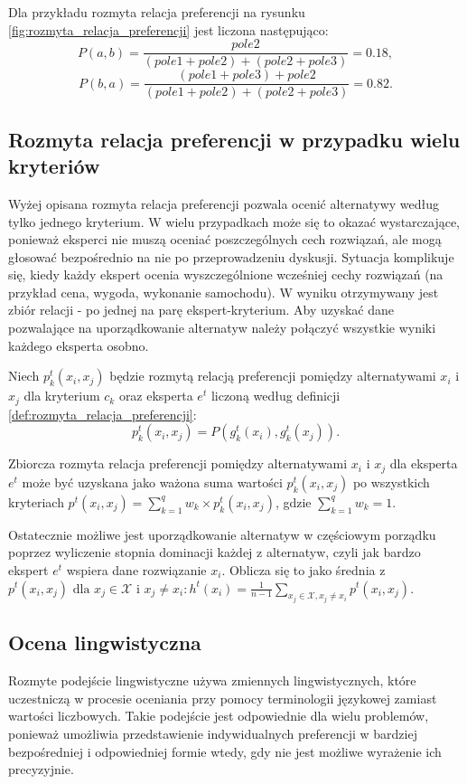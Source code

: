 Dla przykładu rozmyta relacja preferencji na rysunku
\ref{fig:rozmyta_relacja_preferencji} jest liczona następująco:
$$P(a,b) = \frac{pole2}{(pole1 + pole2) + (pole2 + pole3)} = 0.18,$$
$$P(b,a) = \frac{(pole1 + pole3) + pole2}{(pole1 + pole2) + (pole2 + pole3)} =
0.82.$$

\subsection{Rozmyta relacja preferencji w przypadku wielu kryteriów}
Wyżej opisana rozmyta relacja preferencji pozwala ocenić alternatywy według
tylko jednego kryterium. W wielu przypadkach może się to okazać wystarczające,
ponieważ eksperci nie muszą oceniać poszczególnych cech rozwiązań, ale mogą
głosować bezpośrednio na nie po przeprowadzeniu dyskusji. Sytuacja komplikuje
się, kiedy każdy ekspert ocenia wyszczególnione wcześniej cechy rozwiązań (na
przykład cena, wygoda, wykonanie samochodu). W wyniku otrzymywany jest zbiór
relacji - po jednej na parę ekspert-kryterium. Aby uzyskać dane pozwalające na
uporządkowanie alternatyw należy połączyć wszystkie wyniki każdego eksperta
osobno.

Niech $p^t_k(x_i,x_j)$ będzie rozmytą relacją preferencji pomiędzy alternatywami
$x_i$ i $x_j$ dla kryterium $c_k$ oraz eksperta $e^t$ liczoną według definicji
\ref{def:rozmyta_relacja_preferencji}:
$$p^t_k(x_i,x_j) = P(g^t_k(x_i),g^t_k(x_j)).$$

Zbiorcza rozmyta relacja preferencji pomiędzy alternatywami $x_i$ i $x_j$ dla
eksperta $e^t$ może być uzyskana jako ważona suma wartości $p^t_k(x_i,x_j)$ po
wszystkich kryteriach $p^t(x_i,x_j) = \sum_{k=1}^{q} w_k \times p^t_k(x_i,x_j)$,
gdzie $\sum_{k=1}^{q} w_k = 1$.

Ostatecznie możliwe jest uporządkowanie alternatyw w częściowym porządku poprzez
wyliczenie stopnia dominacji każdej z alternatyw, czyli jak bardzo ekspert
$e^t$ wspiera dane rozwiązanie $x_i$. Oblicza się to jako średnia z
$p^t(x_i,x_j) \text{ dla } x_j \in \mathcal{X} \text{ i } x_j \neq x_i \colon
h^t(x_i) = \frac{1}{n-1} \sum_{x_j \in \mathcal{X}, x_j \neq x_i} p^t(x_i,x_j).$

\subsection{Ocena lingwistyczna}
Rozmyte podejście lingwistyczne używa zmiennych lingwistycznych, które
uczestniczą w procesie oceniania przy pomocy terminologii językowej zamiast
wartości liczbowych. Takie podejście jest odpowiednie dla wielu problemów,
ponieważ umożliwia przedstawienie indywidualnych preferencji w bardziej
bezpośredniej i odpowiedniej formie wtedy, gdy nie jest możliwe wyrażenie ich
precyzyjnie.

